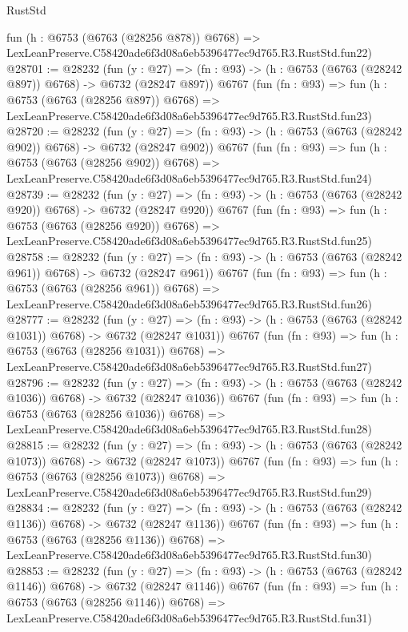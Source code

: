 \begin{lexlean}{RustStd}
\begin{coremodule}
    fun (h : @6753 (@6763 (@28256 @878)) @6768) =>
    LexLeanPreserve.C58420ade6f3d08a6eb5396477ec9d765.R3.RustStd.fun22)
@28701 := @28232
    (fun (y : @27) => (fn : @93) -> (h : @6753 (@6763 (@28242 @897)) @6768) -> @6732 (@28247 @897))
    @6767
    (fun (fn : @93) =>
    fun (h : @6753 (@6763 (@28256 @897)) @6768) =>
    LexLeanPreserve.C58420ade6f3d08a6eb5396477ec9d765.R3.RustStd.fun23)
@28720 := @28232
    (fun (y : @27) => (fn : @93) -> (h : @6753 (@6763 (@28242 @902)) @6768) -> @6732 (@28247 @902))
    @6767
    (fun (fn : @93) =>
    fun (h : @6753 (@6763 (@28256 @902)) @6768) =>
    LexLeanPreserve.C58420ade6f3d08a6eb5396477ec9d765.R3.RustStd.fun24)
@28739 := @28232
    (fun (y : @27) => (fn : @93) -> (h : @6753 (@6763 (@28242 @920)) @6768) -> @6732 (@28247 @920))
    @6767
    (fun (fn : @93) =>
    fun (h : @6753 (@6763 (@28256 @920)) @6768) =>
    LexLeanPreserve.C58420ade6f3d08a6eb5396477ec9d765.R3.RustStd.fun25)
@28758 := @28232
    (fun (y : @27) => (fn : @93) -> (h : @6753 (@6763 (@28242 @961)) @6768) -> @6732 (@28247 @961))
    @6767
    (fun (fn : @93) =>
    fun (h : @6753 (@6763 (@28256 @961)) @6768) =>
    LexLeanPreserve.C58420ade6f3d08a6eb5396477ec9d765.R3.RustStd.fun26)
@28777 := @28232
    (fun (y : @27) =>
    (fn : @93) -> (h : @6753 (@6763 (@28242 @1031)) @6768) -> @6732 (@28247 @1031))
    @6767
    (fun (fn : @93) =>
    fun (h : @6753 (@6763 (@28256 @1031)) @6768) =>
    LexLeanPreserve.C58420ade6f3d08a6eb5396477ec9d765.R3.RustStd.fun27)
@28796 := @28232
    (fun (y : @27) =>
    (fn : @93) -> (h : @6753 (@6763 (@28242 @1036)) @6768) -> @6732 (@28247 @1036))
    @6767
    (fun (fn : @93) =>
    fun (h : @6753 (@6763 (@28256 @1036)) @6768) =>
    LexLeanPreserve.C58420ade6f3d08a6eb5396477ec9d765.R3.RustStd.fun28)
@28815 := @28232
    (fun (y : @27) =>
    (fn : @93) -> (h : @6753 (@6763 (@28242 @1073)) @6768) -> @6732 (@28247 @1073))
    @6767
    (fun (fn : @93) =>
    fun (h : @6753 (@6763 (@28256 @1073)) @6768) =>
    LexLeanPreserve.C58420ade6f3d08a6eb5396477ec9d765.R3.RustStd.fun29)
@28834 := @28232
    (fun (y : @27) =>
    (fn : @93) -> (h : @6753 (@6763 (@28242 @1136)) @6768) -> @6732 (@28247 @1136))
    @6767
    (fun (fn : @93) =>
    fun (h : @6753 (@6763 (@28256 @1136)) @6768) =>
    LexLeanPreserve.C58420ade6f3d08a6eb5396477ec9d765.R3.RustStd.fun30)
@28853 := @28232
    (fun (y : @27) =>
    (fn : @93) -> (h : @6753 (@6763 (@28242 @1146)) @6768) -> @6732 (@28247 @1146))
    @6767
    (fun (fn : @93) =>
    fun (h : @6753 (@6763 (@28256 @1146)) @6768) =>
    LexLeanPreserve.C58420ade6f3d08a6eb5396477ec9d765.R3.RustStd.fun31)

\end{coremodule}
\end{lexlean}
